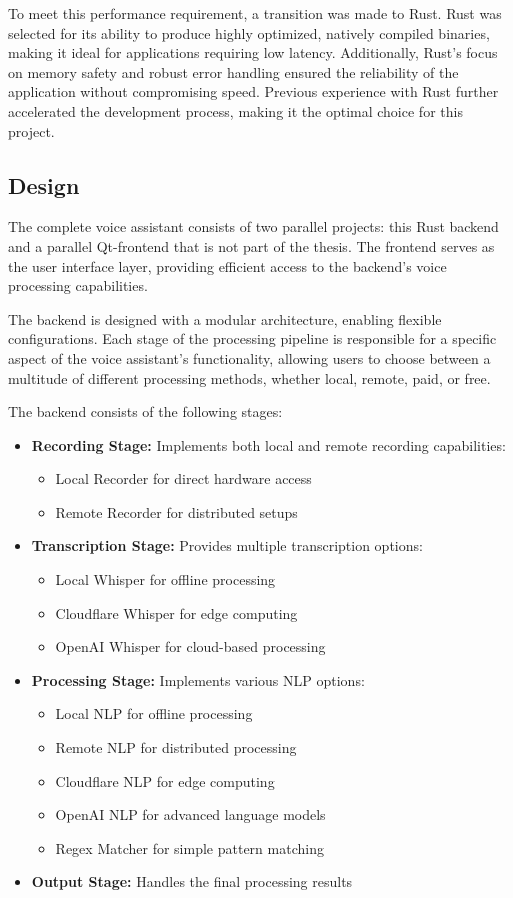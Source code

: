 To meet this performance requirement, a transition was made to Rust.
Rust was selected for its ability to produce highly optimized,
natively compiled binaries, making it ideal for applications requiring low latency.
Additionally, Rust's focus on memory safety and robust error handling
ensured the reliability of the application without compromising speed.
Previous experience with Rust further accelerated the development process,
making it the optimal choice for this project.

\subsection{Design}
The complete voice assistant consists of two parallel projects: this
Rust backend and a parallel Qt-frontend that is not part of the thesis.
The frontend serves as the user interface layer, providing efficient
access to the backend's voice processing capabilities.


The backend is designed with a modular architecture, enabling flexible configurations.
Each stage of the processing pipeline is
responsible for a specific aspect of the voice assistant's functionality,
allowing users to choose between a multitude of different processing methods,
whether local, remote, paid, or free.

The backend consists of the following stages:

\begin{itemize}
    \item \textbf{Recording Stage:} Implements both local and remote
    recording capabilities:
    \begin{itemize}
        \item Local Recorder for direct hardware access
        \item Remote Recorder for distributed setups
    \end{itemize}
    \item \textbf{Transcription Stage:} Provides multiple transcription
    options:
    \begin{itemize}
        \item Local Whisper for offline processing
        \item Cloudflare Whisper for edge computing
        \item OpenAI Whisper for cloud-based processing
    \end{itemize}
    \item \textbf{Processing Stage:} Implements various NLP options:
    \begin{itemize}
        \item Local NLP for offline processing
        \item Remote NLP for distributed processing
        \item Cloudflare NLP for edge computing
        \item OpenAI NLP for advanced language models
        \item Regex Matcher for simple pattern matching
    \end{itemize}
    \item \textbf{Output Stage:} Handles the final processing results
\end{itemize}

